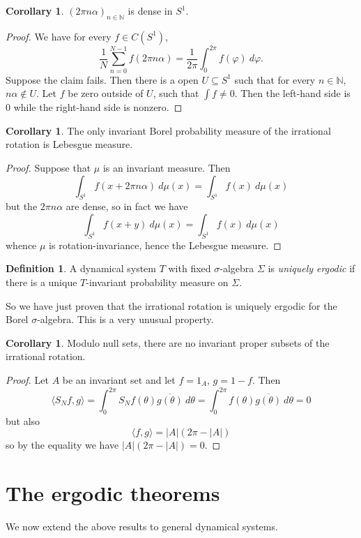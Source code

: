 \documentclass[12pt]{report}
\newcommand{\NN}{\mathbb{N}}
\newcommand{\dfn}[1]{\emph{#1}\index{#1}}
\theoremstyle{definition}
\newtheorem{corollary}[theorem]{Corollary}
\newtheorem{definition}[theorem]{Definition}
\begin{document}
\begin{corollary}
$(2\pi n\alpha)_{n \in \NN}$ is dense in $S^1$.
\end{corollary}
\begin{proof}
We have for every $f \in C(S^1)$,
$$\frac{1}{N} \sum_{n=0}^{N-1} f(2\pi n\alpha) = \frac{1}{2\pi} \int_0^{2\pi} f(\varphi) ~d\varphi.$$
Suppose the claim fails. Then there is a open $U \subseteq S^1$ such that for every $n \in \NN$, $n\alpha \notin U$. Let $f$ be zero outside of $U$, such that $\int f \neq 0$. Then the left-hand side is $0$ while the right-hand side is nonzero.
\end{proof}
\begin{corollary}
The only invariant Borel probability measure of the irrational rotation is Lebesgue measure.
\end{corollary}
\begin{proof}
Suppose that $\mu$ is an invariant measure. Then
$$\int_{S^1} f(x + 2\pi n\alpha) ~d\mu(x) = \int_{S^1} f(x) ~d\mu(x)$$
but the $2\pi n\alpha$ are dense, so in fact we have
$$\int_{S^1} f(x + y) ~d\mu(x) = \int_{S^1} f(x) ~d\mu(x)$$
whence $\mu$ is rotation-invariance, hence the Lebesgue measure.
\end{proof}
\begin{definition}
A dynamical system $T$ with fixed $\sigma$-algebra $\Sigma$ is \dfn{uniquely ergodic} if there is a unique $T$-invariant probability measure on $\Sigma$.
\end{definition}
So we have just proven that the irrational rotation is uniquely ergodic for the Borel $\sigma$-algebra. This is a very unusual property.
\begin{corollary}
Modulo null sets, there are no invariant proper subsets of the irrational rotation.
\end{corollary}
\begin{proof}
Let $A$ be an invariant set and let $f = 1_A$, $g = 1 - f$. Then
$$\langle S_Nf, g\rangle = \int_0^{2\pi} S_Nf(\theta)\overline{g(\theta)} ~d\theta = \int_0^{2\pi} f(\theta)\overline{g(\theta)} ~d\theta = 0$$
but also
$$\langle f, g\rangle = |A|(2\pi - |A|)$$
so by the equality we have $|A|(2\pi - |A|) = 0$.
\end{proof}

\section{The ergodic theorems}
We now extend the above results to general dynamical systems.
\end{document}
